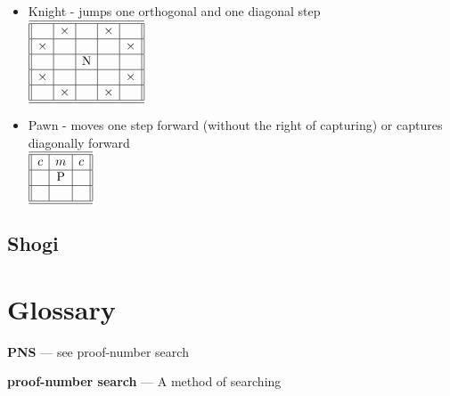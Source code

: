 \documentclass[10pt,dvipdfmx]{report}
\let\x=\times
\begin{document}
\begin{itemize}
\item Knight - jumps one orthogonal and one diagonal step \\ 
	$\begin{array}{||c|c|c|c|c||}\hline\hline
   & \x &          & \x &    \\\hline
\x &    &          &    & \x \\\hline
   &    & \text{N} &    &    \\\hline
\x &    &          &    & \x \\\hline
   & \x &          & \x &    \\\hline\hline
\end{array}$
\item Pawn - moves one step forward (without the right of capturing) or captures diagonally forward \\
	$\begin{array}{||c|c|c||}\hline\hline c & m & c \\\hline    & \text{P} &    \\\hline    &    &   \\\hline\hline\end{array}$
\end{itemize}

\section{Shogi}

\chapter*{Glossary}

\newcommand{\gloss}[2]{\par{\bf{#1}} --- {#2}}

\gloss{PNS}{see proof-number search}
\gloss{proof-number search}{A method of searching}

\newpage
{}
\printindex


\cleardoublepage
{}


\end{document}
